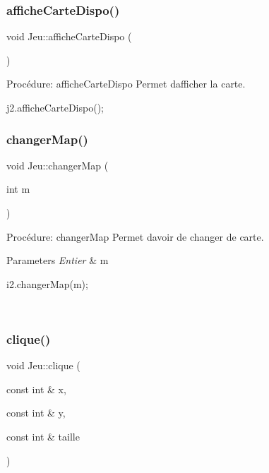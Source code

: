 \subsubsection{\texorpdfstring{affiche\+Carte\+Dispo()}{afficheCarteDispo()}}
{\footnotesize\ttfamily void Jeu\+::affiche\+Carte\+Dispo (\begin{DoxyParamCaption}{ }\end{DoxyParamCaption})}



Procédure\+: affiche\+Carte\+Dispo Permet d\textquotesingle{}afficher la carte. 


\begin{DoxyCode}
j2.afficheCarteDispo();
\end{DoxyCode}
 \mbox{\label{classJeu_ada22a232d25c271778a3a0b0ecdd61c9}} 
\subsubsection{\texorpdfstring{changer\+Map()}{changerMap()}}
{\footnotesize\ttfamily void Jeu\+::changer\+Map (\begin{DoxyParamCaption}\item[{int}]{m }\end{DoxyParamCaption})}



Procédure\+: changer\+Map Permet d\textquotesingle{}avoir de changer de carte. 


\begin{DoxyParams}{Parameters}
{\em Entier} & m 
\begin{DoxyCode}
i2.changerMap(m);
\end{DoxyCode}
 \\
\hline
\end{DoxyParams}
\mbox{\label{classJeu_a6a95f56b4cdcf94806237e672de41d7f}} 
\subsubsection{\texorpdfstring{clique()}{clique()}}
{\footnotesize\ttfamily void Jeu\+::clique (\begin{DoxyParamCaption}\item[{const int \&}]{x,  }\item[{const int \&}]{y,  }\item[{const int \&}]{taille }\end{DoxyParamCaption})}



